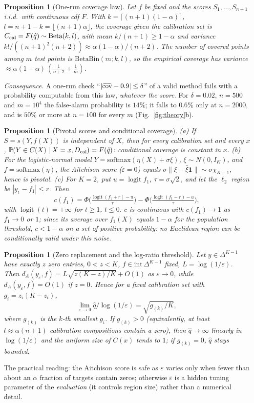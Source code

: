 \documentclass{article}
\theoremstyle{plain}
\newtheorem{proposition}[theorem]{Proposition}
\theoremstyle{remark}
\newcommand{\simplex}{\Delta^{K-1}}
\renewcommand{\Pr}{\mathbb{P}}
\DeclareMathOperator{\logit}{logit}
\begin{document}
\begin{proposition}[One-run coverage law]\label{prop:beta}
Let $f$ be fixed and the scores $S_1,\dots,S_{n+1}$ i.i.d.\ with continuous cdf $F$. With $k=\lceil(n+1)(1-\alpha)\rceil$, $l=n+1-k=\lfloor(n+1)\alpha\rfloor$, the coverage given the calibration set is $C_{\rm cal}=F(\hat q)\sim\mathrm{Beta}(k,l)$, with mean $k/(n+1)\ge1-\alpha$ and variance $kl/((n+1)^2(n+2))\approx\alpha(1-\alpha)/(n+2)$. The number of covered points among $m$ test points is $\mathrm{BetaBin}(m;k,l)$, so the empirical coverage has variance $\approx\alpha(1-\alpha)\,(\tfrac1{n+2}+\tfrac1m)$.
\end{proposition}
\emph{Consequence.} A one-run check ``$|\widehat{\rm cov}-0.9|\le\delta$'' of a valid method fails with a probability computable from this law, \emph{whatever the score}. For $\delta=0.02$, $n=500$ and $m=10^4$ the false-alarm probability is $14\%$; it falls to $0.6\%$ only at $n=2000$, and is $50\%$ or more at $n=100$ for every $m$ (Fig.~\ref{fig:theory}b).

\begin{proposition}[Pivotal scores and conditional coverage]\label{prop:pivot}
(a) If $S=s(Y,f(X))$ is independent of $X$, then for every calibration set and every $x$, $\Pr(Y\in C(X)\mid X=x,D_{\rm cal})=F(\hat q)$: conditional coverage is constant in $x$. (b) For the logistic-normal model $Y=\mathrm{softmax}(\eta(X)+\sigma\xi)$, $\xi\sim N(0,I_K)$, and $f=\mathrm{softmax}(\eta)$, the Aitchison score ($\varepsilon=0$) equals $\sigma\|\xi-\bar\xi\mathbf 1\|\sim\sigma\chi_{K-1}$, hence is pivotal. (c) For $K=2$, put $u=\logit f_1$, $\tau=\sigma\sqrt2$, and let the $\ell_2$ region be $|y_1-f_1|\le r$. Then
\[
c(f_1)=\Phi\!\Big(\tfrac{\logit(f_1+r)-u}{\tau}\Big)-\Phi\!\Big(\tfrac{\logit(f_1-r)-u}{\tau}\Big),
\]
with $\logit(t)=\pm\infty$ for $t\ge1$, $t\le0$. $c$ is continuous with $c(f_1)\to1$ as $f_1\to0$ or $1$; since its average over $f_1(X)$ equals $1-\alpha$ for the population threshold, $c<1-\alpha$ on a set of positive probability: \emph{no Euclidean region can be conditionally valid under this noise}.
\end{proposition}

\begin{proposition}[Zero replacement and the log-ratio threshold]\label{prop:zero}
Let $y\in\simplex$ have exactly $z$ zero entries, $0<z<K$, $f\in\mathrm{int}\,\simplex$ fixed, $L=\log(1/\varepsilon)$. Then $d_A(y_\varepsilon,f)=L\sqrt{z(K-z)/K}+O(1)$ as $\varepsilon\to0$, while $d_A(y_\varepsilon,f)=O(1)$ if $z=0$. Hence for a fixed calibration set with $g_i=z_i(K-z_i)$,
\[
\lim_{\varepsilon\to0}\hat q/\log(1/\varepsilon)=\sqrt{g_{(k)}/K},
\]
where $g_{(k)}$ is the $k$-th smallest $g_i$. If $g_{(k)}>0$ (equivalently, at least $l\approx\alpha(n+1)$ calibration compositions contain a zero), then $\hat q\to\infty$ linearly in $\log(1/\varepsilon)$ and the uniform size of $C(x)$ tends to $1$; if $g_{(k)}=0$, $\hat q$ stays bounded.
\end{proposition}
The practical reading: the Aitchison score is safe as $\varepsilon$ varies only when fewer than about an $\alpha$ fraction of targets contain zeros; otherwise $\varepsilon$ is a hidden tuning parameter of the \emph{evaluation} (it controls region size) rather than a numerical detail.
\end{document}
